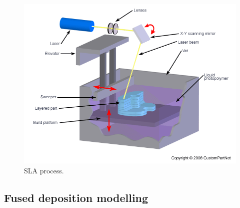\begin{figure}[t]
  \centering
  \includegraphics[scale=0.5]{Figs//SLA_PROCESS.png}
  \caption[SLA process]{\footnotesize SLA process.}
  \label{Fig:SLA}
\end{figure}

\subsection{Fused deposition modelling}

